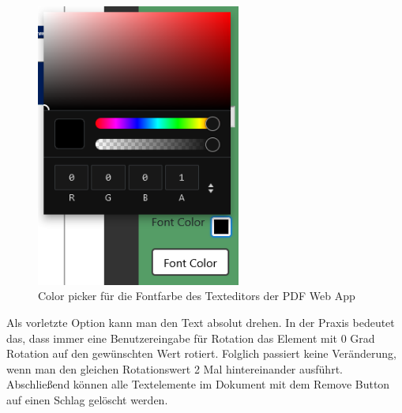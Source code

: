 \begin{figure}[!htbp]
	\centering
	\includegraphics[width=0.6\textwidth]{"images/fontcolor.png"}
	\caption{Color picker für die Fontfarbe des Texteditors der PDF Web App}
	\label{fig:fontcolor}
\end{figure}

Als vorletzte Option kann man den Text absolut drehen. In der Praxis bedeutet das, dass immer eine Benutzereingabe für Rotation das Element mit 0 Grad Rotation auf den gewünschten Wert rotiert. Folglich passiert keine Veränderung, wenn man den gleichen Rotationswert 2 Mal hintereinander ausführt. Abschließend können alle Textelemente im Dokument mit dem Remove Button auf einen Schlag gelöscht werden. 